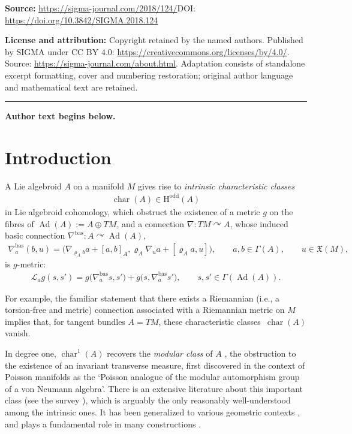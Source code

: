 \documentclass[11pt]{article}
\numberwithin{equation}{section}
\newcommand{\acts}{\curvearrowright}
\newcommand{\8}{\infty}
\newcommand{\X}{\mathfrak{X}}
\begin{document}
\noindent\textbf{Source:} \url{https://sigma-journal.com/2018/124/}\quad DOI: \url{https://doi.org/10.3842/SIGMA.2018.124}\par
\noindent\textbf{License and attribution:} Copyright retained by the named authors. Published by SIGMA under CC BY 4.0: \url{https://creativecommons.org/licenses/by/4.0/}. Source: \url{https://sigma-journal.com/about.html}. Adaptation consists of standalone excerpt formatting, cover and numbering restoration; original author language and mathematical text are retained.\par
\medskip\hrule\medskip\noindent\textbf{Author text begins below.}\par
\setcounter{section}{0}
\setcounter{subsection}{0}
\setcounter{subsubsection}{0}
\setcounter{equation}{0}
\section{Introduction}
A Lie algebroid $A$ on a manifold $M$ gives rise to {\it intrinsic characteristic classes}
\begin{gather*}
 \operatorname{char}(A) \in \mathrm{H}^{\mathrm{odd}}(A)
\end{gather*}in Lie algebroid cohomology, which obstruct the existence of a metric $g$ on the fibres of $\operatorname{Ad}(A):=A\oplus TM$, and a connection $\nabla\colon TM \acts A$, whose induced basic connection $\nabla^{\mathrm{bas}}\colon A \acts \operatorname{Ad}(A)$,
\begin{gather*}
 \nabla^{\mathrm{bas}}_a(b,u) = \big(\nabla_{\varrho_Ab}a+[a,b]_A,\varrho_A\nabla_{u}a+[\varrho_Aa,u]\big), \qquad a,b \in \Gamma(A), \qquad u \in \X(M),
\end{gather*}is $g$-metric:
\begin{gather*}
 \mathscr{L}_ag(s,s') = g\big(\nabla^{\mathrm{bas}}_as,s'\big) + g\big(s,\nabla^{\mathrm{bas}}_as'\big), \qquad s,s' \in \Gamma(\operatorname{Ad}(A)).
\end{gather*}

For example, the familiar statement that there exists a Riemannian (i.e., a torsion-free and metric) connection associated with a Riemannian metric on $M$ implies that, for tangent bundles $A=TM$, these characteristic classes~$\operatorname{char}(A)$ vanish.

In degree one, $\operatorname{char}^1(A)$ recovers the \emph{modular class} of $A$ \cite{EvensLuAlan}, the obstruction to the existence of an invariant transverse measure, first discovered in the context of Poisson manifolds \cite{Koszul,Weinstein} as the `Poisson analogue of the modular automorphism group of a von Neumann algebra'. There is an extensive literature about this important class (see the survey \cite{Yvette}), which is arguably the only reasonably well-understood among the intrinsic ones. It has been generalized to various geometric contexts \cite{CaseiroFernandes,Grabowski,Huebschmann, Yvette_BV,YvetteLaurentAlan,Yvette_Alan,Mehta,StienonXu,Vaisman}, and plays a fundamental role in many constructions \cite{CaseiroFernandes,PMCT1,FernandesDamianou,EvensLuAlan,PT_Homology,GMP,Kubarski_Fibre,Kubarski_Mishchenko,Xu}.
\end{document}
